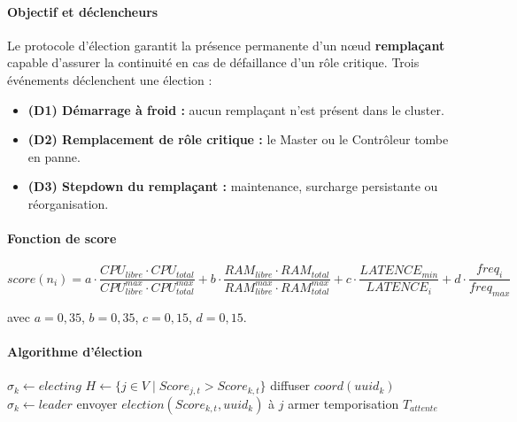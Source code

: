 \documentclass[12pt,a4paper]{report}
\begin{document}
\paragraph{Objectif et déclencheurs}

Le protocole d'élection garantit la présence permanente d'un nœud \textbf{remplaçant} capable d'assurer la continuité en cas de défaillance d'un rôle critique. Trois événements déclenchent une élection :

\begin{itemize}
    \item[$\bullet$] \textbf{(D1) Démarrage à froid :} aucun remplaçant n'est présent dans le cluster.
    \item[$\bullet$] \textbf{(D2) Remplacement de rôle critique :} le Master ou le Contrôleur tombe en panne.
    \item[$\bullet$] \textbf{(D3) Stepdown du remplaçant :} maintenance, surcharge persistante ou réorganisation.
\end{itemize}

\paragraph{Fonction de score}

\[
score(n_i) =
a \cdot \frac{CPU_{libre} \cdot CPU_{total}}{CPU_{libre}^{max} \cdot CPU_{total}^{max}}
+ b \cdot \frac{RAM_{libre} \cdot RAM_{total}}{RAM_{libre}^{max} \cdot RAM_{total}^{max}}
+ c \cdot \frac{LATENCE_{min}}{LATENCE_i}
+ d \cdot \frac{freq_i}{freq_{max}}
\]

avec $a = 0{,}35$, $b = 0{,}35$, $c = 0{,}15$, $d = 0{,}15$.

\paragraph{Algorithme d'élection}

\begin{algorithm}[H]
\caption{Initiation d'une élection par le nœud $k$}
\begin{algorithmic}[1]
\State $\sigma_k \gets electing$
\State $H \gets \{ j \in V \mid Score_{j,t} > Score_{k,t} \}$
    \State diffuser $coord(uuid_k)$
    \State $\sigma_k \gets leader$
\Else
        \State envoyer $election(Score_{k,t}, uuid_k)$ à $j$
    \EndFor
    \State armer temporisation $T_{attente}$
\EndIf
\end{algorithmic}
\end{algorithm}
\end{document}

